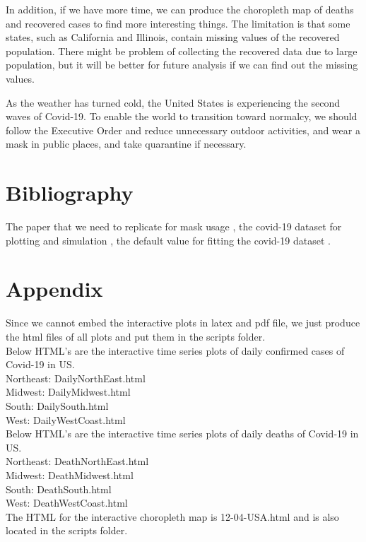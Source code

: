 \documentclass{article}
\begin{document}
In addition, if we have more time, we can produce the choropleth map of deaths and recovered cases to find more interesting things. The limitation is that some states, such as California and Illinois, contain missing values of the recovered population. There might be problem of collecting the recovered data due to large population, but it will be better for future analysis if we can find out the missing values. 


As the weather has turned cold, the United States is experiencing the second waves of Covid-19. To enable the world to transition toward normalcy, we should follow the Executive Order and reduce unnecessary outdoor activities, and wear a mask in public places, and take quarantine if necessary. 





\section{Bibliography}
The paper that we need to replicate for mask usage \cite{Steff2020mask},  the covid-19 dataset for plotting and simulation \cite{Johnhopkins}, the default value for fitting the covid-19 dataset \cite{Cooper2020SIR}.


\printbibliography






\section{Appendix}

Since we cannot embed the interactive plots in latex and pdf file, we just produce the html files of all plots and put them in the scripts folder.\\

\noindent
Below HTML's are the interactive time series plots of daily confirmed cases of Covid-19 in US.\\

Northeast: DailyNorthEast.html\\

Midwest: DailyMidwest.html\\

South: DailySouth.html\\

West: DailyWestCoast.html\\



\noindent
Below HTML's are the interactive time series plots of daily deaths of Covid-19 in US. \\

Northeast: DeathNorthEast.html\\

Midwest: DeathMidwest.html\\

South: DeathSouth.html\\

West: DeathWestCoast.html\\




\noindent
The HTML for the interactive choropleth map is 12-04-USA.html and is also located in the scripts folder. \\
\end{document}
